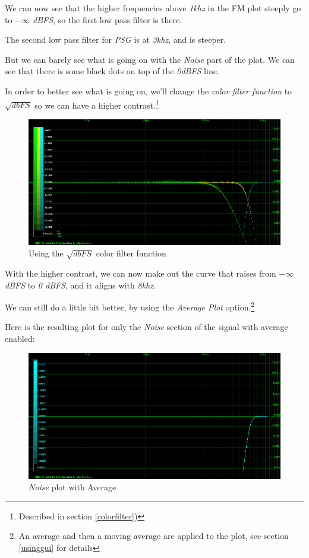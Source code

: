 \documentclass[10pt,a4paper]{report}
\begin{document}
We can now see that the higher frequencies above \textit{1khz} in the FM plot steeply go to \textit{$-\infty$ dBFS}, so the first low pass filter is there.

The second low pass filter for \textit{PSG} is at \textit{3khz}, and is steeper.

But we can barely see what is going on with the \textit{Noise} part of the plot. We can see that there is some black dots on top of the \textit{0dBFS} line.

In order to better see what is going on, we'll change the \textit{color filter function} to $\sqrt{dbFS}$ so we can have a higher contrast.\footnote{Described in section \ref{colorfilter})}

\begin{figure}[H]
	\centering
	\includegraphics[width=1.0\linewidth]{plots/Plot4-2-All-sqrt.png}
	\caption[Using SQRT]{Using the $\sqrt{dbFS}$ color filter function}
	\label{fig:plot4-2-all-sqrt}
\end{figure}

With the higher contrast, we can now make out the curve that raises from \textit{$-\infty$ dBFS} to \textit{0 dBFS}, and it aligns with \textit{8khz}.

We can still do a little bit better, by using the \textit{Average Plot} option.\footnote{An average and then a moving average are applied to the plot, see section \ref{usinggui} for details}

Here is the resulting plot for only the \textit{Noise} section of the signal with average enabled:

\begin{figure}[H]
	\centering
	\includegraphics[width=1.0\linewidth]{plots/Plot4-3-AVG-Noise.png}
	\caption[Noise Average]{\textit{Noise} plot with Average}
	\label{fig:plot4-3-avg-noise}
\end{figure}
\end{document}
